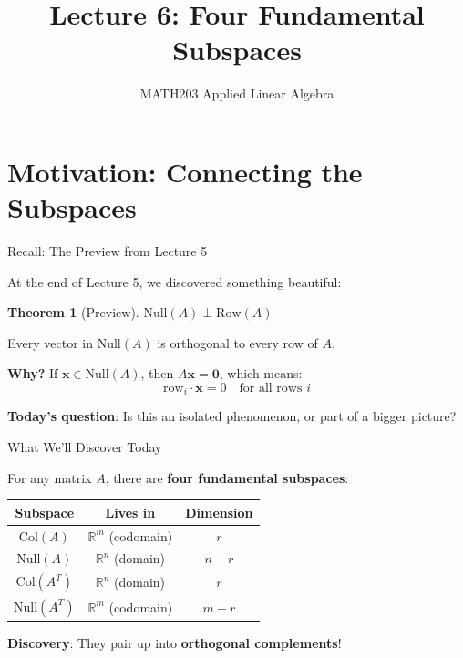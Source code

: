 \documentclass[10pt]{beamer}
\title{Lecture 6: Four Fundamental Subspaces}
\subtitle{MATH203 Applied Linear Algebra}
\date{}
\theoremstyle{definition}
\newtheorem{thm}{Theorem}[section]
\newcommand{\x}[1]{\alert{\textbf{#1}}}
\begin{document}
\maketitle

\section{Motivation: Connecting the Subspaces}

\begin{frame}{Recall: The Preview from Lecture 5}

At the end of Lecture 5, we discovered something beautiful:

\begin{thm}[Preview]
$\text{Null}(A) \perp \text{Row}(A)$

Every vector in $\text{Null}(A)$ is orthogonal to every row of $A$.
\end{thm}

\vspace{1em}

\x{Why?} If $\mathbf{x} \in \text{Null}(A)$, then $A\mathbf{x} = \mathbf{0}$, which means:
$$\text{row}_i \cdot \mathbf{x} = 0 \quad \text{for all rows } i$$

\vspace{1em}

\x{Today's question}: Is this an isolated phenomenon, or part of a bigger picture?

\end{frame}

\begin{frame}{What We'll Discover Today}

For any matrix $A$, there are \x{four fundamental subspaces}:

\vspace{1em}

\begin{center}
\begin{tabular}{|c|c|c|}
\hline
\textbf{Subspace} & \textbf{Lives in} & \textbf{Dimension} \\
\hline
$\text{Col}(A)$ & $\mathbb{R}^m$ (codomain) & $r$ \\
$\text{Null}(A)$ & $\mathbb{R}^n$ (domain) & $n - r$ \\
$\text{Col}(A^T)$ & $\mathbb{R}^n$ (domain) & $r$ \\
$\text{Null}(A^T)$ & $\mathbb{R}^m$ (codomain) & $m - r$ \\
\hline
\end{tabular}
\end{center}

\vspace{1em}

\x{Discovery}: They pair up into \x{orthogonal complements}!

\end{frame}
\end{document}
